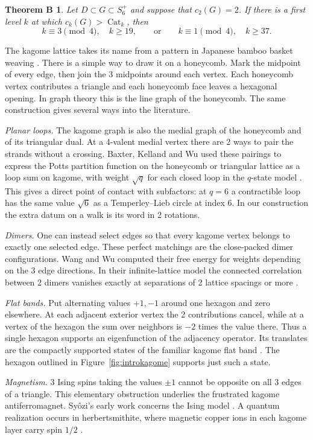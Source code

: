 \documentclass[11pt,a4paper]{amsart}
\newtheorem*{thmB}{Theorem B}
\newcommand{\Cat}{\operatorname{Cat}}
\begin{document}
\begin{thmB}
Let $D\subset G\subset S_6^+$ and suppose that $c_2(G)=2$. If there is a first level $k$ at which $c_k(G)>\Cat_k$, then
\[
 k\equiv3\pmod4,\quad k\geq19,
 \qquad\text{or}\qquad
 k\equiv1\pmod4,\quad k\geq37 .
\]
\end{thmB}

The kagome lattice takes its name from a pattern in Japanese bamboo basket weaving \cite{mek}. There is a simple way to draw it on a honeycomb. Mark the midpoint of every edge, then join the 3 midpoints around each vertex. Each honeycomb vertex contributes a triangle and each honeycomb face leaves a hexagonal opening. In graph theory this is the line graph of the honeycomb. The same construction gives several ways into the literature.

\smallskip
\noindent\emph{Planar loops.} The kagome graph is also the medial graph of the honeycomb and of its triangular dual. At a 4-valent medial vertex there are 2 ways to pair the strands without a crossing. Baxter, Kelland and Wu used these pairings to express the Potts partition function on the honeycomb or triangular lattice as a loop sum on kagome, with weight $\sqrt q$ for each closed loop in the $q$-state model \cite{bkw}. This gives a direct point of contact with subfactors: at $q=6$ a contractible loop has the same value $\sqrt6$ as a Temperley--Lieb circle at index 6. In our construction the extra datum on a walk is its word in 2 rotations.

\smallskip
\noindent\emph{Dimers.} One can instead select edges so that every kagome vertex belongs to exactly one selected edge. These perfect matchings are the close-packed dimer configurations. Wang and Wu computed their free energy for weights depending on the 3 edge directions. In their infinite-lattice model the connected correlation between 2 dimers vanishes exactly at separations of 2 lattice spacings or more \cite{ww}.

\smallskip
\noindent\emph{Flat bands.} Put alternating values $+1,-1$ around one hexagon and zero elsewhere. At each adjacent exterior vertex the 2 contributions cancel, while at a vertex of the hexagon the sum over neighbors is $-2$ times the value there. Thus a single hexagon supports an eigenfunction of the adjacency operator. Its translates are the compactly supported states of the familiar kagome flat band \cite{bwb}. The hexagon outlined in Figure~\ref{fig:introkagome} supports just such a state.

\smallskip
\noindent\emph{Magnetism.} 3 Ising spins taking the values $\pm1$ cannot be opposite on all 3 edges of a triangle. This elementary obstruction underlies the frustrated kagome antiferromagnet. Sy\^ozi's early work concerns the Ising model \cite{syozi}. A quantum realization occurs in herbertsmithite, where magnetic copper ions in each kagome layer carry spin $1/2$ \cite{norman}.
\end{document}
